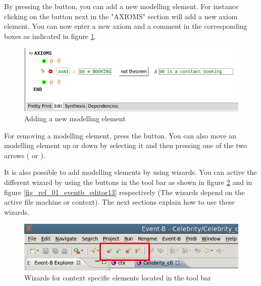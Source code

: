 By pressing the  button, you can add a new modelling element. For instance clicking on the  button next in the "AXIOMS" section will add a new axiom element. You can now enter a new axiom and a comment in the corresponding boxes as indicated in figure \ref{fig_ref_01_eventb_editor3}.

\begin{figure}[!h]
\begin{center}
	\includegraphics{img/reference/ref_01_eventb_editor3.png}
	\caption{Adding a new modelling element}
	\label{fig_ref_01_eventb_editor3}
\end{center}
\end{figure}

For removing a modelling element, press the  button. You can also move an modelling element up or down by selecting it and then pressing one of the two arrows ( or ).

It is also possible to add modelling elements by using wizards. You can active the different wizard by using the buttons in the tool bar as shown in figure \ref{fig_ref_01_eventb_editor12} and in figure \ref{fig_ref_01_eventb_editor13} respectively (The wizards depend on the active file machine or context). The next sections explain how to use these wizards.

\begin{figure}[!h]
\begin{center}
	\includegraphics{img/reference/ref_01_eventb_editor12.png}
	\caption{Wizards for context specific elements located in the tool bar}
	\label{fig_ref_01_eventb_editor12}
\end{center}
\end{figure}

